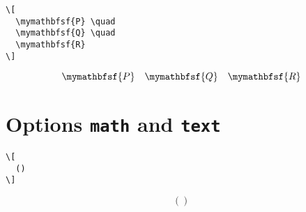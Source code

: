 \documentclass{article}
\begin{document}
\begin{verbatim}
\[
  \mymathbfsf{P} \quad
  \mymathbfsf{Q} \quad
  \mymathbfsf{R}
\]
\end{verbatim}
%
\[
  \mymathbfsf{P} \quad
  \mymathbfsf{Q} \quad
  \mymathbfsf{R}
\]

\section{Options \texttt{math} and \texttt{text}}

\blindmathtrue
\blindtext
\blindmathfalse

\begin{verbatim}
\[
  ()
\]
\end{verbatim}
%
\[
  ()
\]
\end{document}
